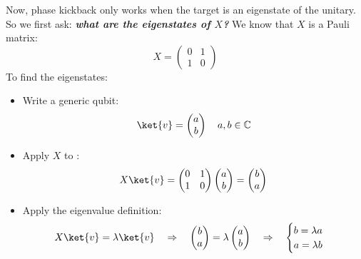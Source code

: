\highspace
Now, phase kickback only works when the target is an eigenstate of the unitary. So we first ask: \emph{\textbf{what are the eigenstates of $X$?}} We know that $X$ is a Pauli matrix:
\begin{equation*}
    X = \begin{pmatrix}
        0 & 1 \\
        1 & 0
    \end{pmatrix}
\end{equation*}
To find the eigenstates:
\begin{itemize}
    \item Write a generic qubit:
    \begin{equation*}
        \ket{v} = \begin{pmatrix}
            a \\ b
        \end{pmatrix}
        \quad
        a,b \in \mathbb{C}
    \end{equation*}
    \item Apply $X$ to :
    \begin{equation*}
        X\ket{v} = \begin{pmatrix}
            0 & 1 \\
            1 & 0
        \end{pmatrix}
        \begin{pmatrix}
            a \\ b
        \end{pmatrix} =
        \begin{pmatrix}
            b \\ a
        \end{pmatrix}
    \end{equation*}
    \item Apply the eigenvalue definition:
    \begin{equation*}
        X\ket{v} = \lambda\ket{v} \quad \Rightarrow \quad
        \begin{pmatrix}
            b \\ a
        \end{pmatrix} =
        \lambda
        \begin{pmatrix}
            a \\ b
        \end{pmatrix}
        \quad \Rightarrow \quad
        \begin{cases}
            b = \lambda a \\
            a = \lambda b
        \end{cases}

\end{equation*}
\end{itemize}

